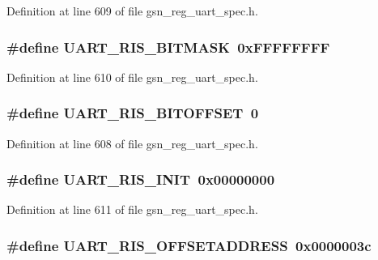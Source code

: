 Definition at line 609 of file gsn\_\-reg\_\-uart\_\-spec.h.

\hypertarget{a00575_ae977cd3d0eb77466e8fef9382aa0ea98}{
\subsubsection[{UART\_\-RIS\_\-BITMASK}]{\setlength{\rightskip}{0pt plus 5cm}\#define UART\_\-RIS\_\-BITMASK~0xFFFFFFFF}}
\label{a00575_ae977cd3d0eb77466e8fef9382aa0ea98}


Definition at line 610 of file gsn\_\-reg\_\-uart\_\-spec.h.

\hypertarget{a00575_a7ab75cea1b76edcc977e3ef44869375c}{
\subsubsection[{UART\_\-RIS\_\-BITOFFSET}]{\setlength{\rightskip}{0pt plus 5cm}\#define UART\_\-RIS\_\-BITOFFSET~0}}
\label{a00575_a7ab75cea1b76edcc977e3ef44869375c}


Definition at line 608 of file gsn\_\-reg\_\-uart\_\-spec.h.

\hypertarget{a00575_ab59a1b0a385deac9efa01a5f5bfbd27a}{
\subsubsection[{UART\_\-RIS\_\-INIT}]{\setlength{\rightskip}{0pt plus 5cm}\#define UART\_\-RIS\_\-INIT~0x00000000}}
\label{a00575_ab59a1b0a385deac9efa01a5f5bfbd27a}


Definition at line 611 of file gsn\_\-reg\_\-uart\_\-spec.h.

\hypertarget{a00575_a0a2b08b08144ce3acb5f5862ac3594a8}{
\subsubsection[{UART\_\-RIS\_\-OFFSETADDRESS}]{\setlength{\rightskip}{0pt plus 5cm}\#define UART\_\-RIS\_\-OFFSETADDRESS~0x0000003c}}
\label{a00575_a0a2b08b08144ce3acb5f5862ac3594a8}


